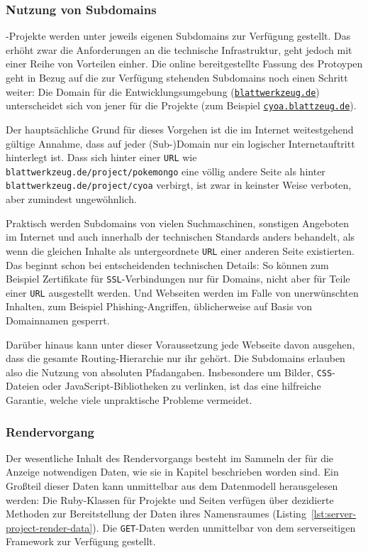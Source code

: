 \subsubsection{Nutzung von Subdomains}

\idename{}-Projekte werden unter jeweils eigenen Subdomains zur Verfügung gestellt. Das erhöht zwar die Anforderungen an die technische Infrastruktur, geht jedoch mit einer Reihe von Vorteilen einher. Die online bereitgestellte Fassung des Protoypen geht in Bezug auf die zur Verfügung stehenden Subdomains noch einen Schritt weiter: Die Domain für die Entwicklungsumgebung (\href{http://blattwerkzeug.de}{\texttt{blattwerkzeug.de}}) unterscheidet sich von jener für die Projekte (zum Beispiel \href{http://cyoa.blattzeug.de}{\texttt{cyoa.blattzeug.de}}).

Der hauptsächliche Grund für dieses Vorgehen ist die im Internet weitestgehend gültige Annahme, dass auf jeder (Sub-)Domain nur ein logischer Internetauftritt hinterlegt ist. Dass sich hinter einer \texttt{URL} wie \texttt{blatt\-werk\-zeug.de\-/project\-/pokemongo} eine völlig andere Seite als hinter \texttt{blatt\-werk\-zeug.de\-/project\-/cyoa} verbirgt, ist zwar in keinster Weise verboten, aber zumindest ungewöhnlich.

Praktisch werden Subdomains von vielen Suchmaschinen, sonstigen Angeboten im Internet und auch innerhalb der technischen Standards anders behandelt, als wenn die gleichen Inhalte als untergeordnete \texttt{URL} einer anderen Seite existierten. Das beginnt schon bei entscheidenden technischen Details: So können zum Beispiel Zertifikate für \texttt{SSL}-Verbindungen nur für Domains, nicht aber für Teile einer \texttt{URL} ausgestellt werden. Und Webseiten werden im Falle von unerwünschten Inhalten, zum Beispiel Phishing-Angriffen, üblicherweise auf Basis von Domainnamen gesperrt.

Darüber hinaus kann unter dieser Voraussetzung jede Webseite davon ausgehen, dass die gesamte Routing-Hierarchie nur ihr gehört. Die Subdomains erlauben also die Nutzung von absoluten Pfadangaben. Insbesondere um Bilder, \texttt{CSS}-Dateien oder JavaScript-Bibliotheken zu verlinken, ist das eine hilfreiche Garantie, welche viele unpraktische Probleme vermeidet.

\subsubsection{Rendervorgang}

Der wesentliche Inhalt des Rendervorgangs besteht im Sammeln der für die Anzeige notwendigen Daten, wie sie in Kapitel  beschrieben worden sind. Ein Großteil dieser Daten kann unmittelbar aus dem Datenmodell heraus\-gelesen werden: Die Ruby-Klassen für Projekte und Seiten verfügen über dezidierte Methoden zur Bereitstellung der Daten ihres Namensraumes (Listing~\ref{lst:server-project-render-data}). Die \texttt{GET}-Daten werden unmittelbar von dem serverseitigen Framework zur Verfügung gestellt.

